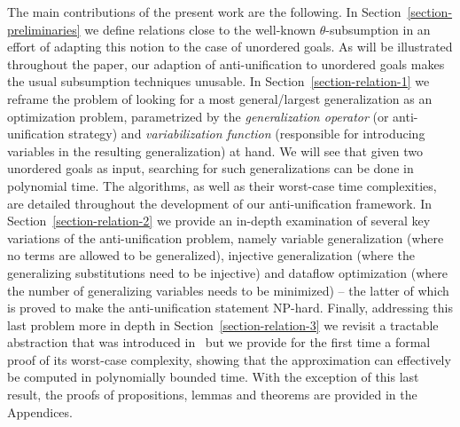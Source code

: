 The main contributions of the present work are the following. In Section~\ref{section-preliminaries} we define relations close to the well-known $\theta$-subsumption in an effort of adapting this notion to the case of unordered goals. As will be illustrated throughout the paper, our adaption of anti-unification to unordered goals makes the usual subsumption techniques unusable. In Section~\ref{section-relation-1} we reframe the problem of looking for a most general/largest generalization as an optimization problem, parametrized by the \textit{generalization operator} (or anti-unification strategy) and \textit{variabilization function} (responsible for introducing variables in the resulting generalization) at hand.  We will see that given two unordered goals as input, searching for such generalizations can be done in polynomial time. The algorithms, as well as their worst-case time complexities, are detailed throughout the development of our anti-unification framework. 
 In Section~\ref{section-relation-2} we provide an in-depth examination of several key variations of the anti-unification problem, namely variable generalization (where no terms are allowed to be generalized), injective generalization (where the generalizing substitutions need to be injective) and dataflow optimization (where the number of generalizing variables needs to be minimized) -- the latter of which is proved to make the anti-unification statement NP-hard. Finally, addressing this last problem more in depth in Section~\ref{section-relation-3} we revisit a tractable abstraction that was introduced in~\cite{gen} but we provide for the first time a formal proof of its worst-case complexity, showing that the approximation can effectively be computed in polynomially bounded time. With the exception of this last result, the proofs of propositions, lemmas and theorems are provided in the Appendices.





